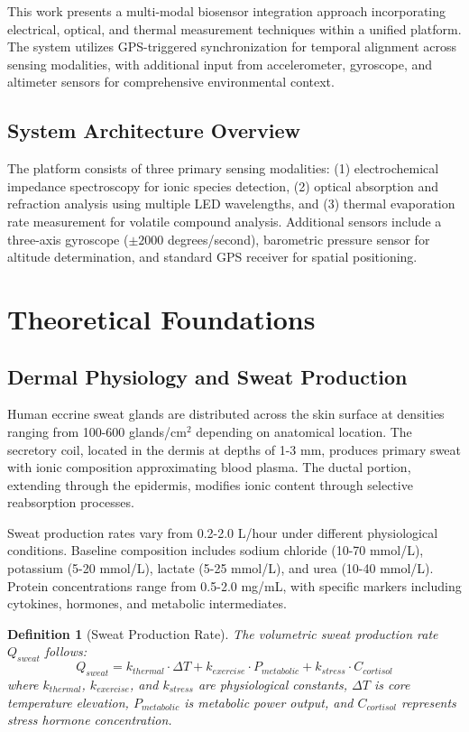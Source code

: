 \documentclass[12pt,a4paper]{article}
\newtheorem{definition}[theorem]{Definition}
\begin{document}
This work presents a multi-modal biosensor integration approach incorporating electrical, optical, and thermal measurement techniques within a unified platform. The system utilizes GPS-triggered synchronization for temporal alignment across sensing modalities, with additional input from accelerometer, gyroscope, and altimeter sensors for comprehensive environmental context.

\subsection{System Architecture Overview}

The platform consists of three primary sensing modalities: (1) electrochemical impedance spectroscopy for ionic species detection, (2) optical absorption and refraction analysis using multiple LED wavelengths, and (3) thermal evaporation rate measurement for volatile compound analysis. Additional sensors include a three-axis gyroscope (\(\pm 2000\) degrees/second), barometric pressure sensor for altitude determination, and standard GPS receiver for spatial positioning.

\section{Theoretical Foundations}

\subsection{Dermal Physiology and Sweat Production}

Human eccrine sweat glands are distributed across the skin surface at densities ranging from 100-600 glands/cm\(^2\) depending on anatomical location. The secretory coil, located in the dermis at depths of 1-3 mm, produces primary sweat with ionic composition approximating blood plasma. The ductal portion, extending through the epidermis, modifies ionic content through selective reabsorption processes.

Sweat production rates vary from 0.2-2.0 L/hour under different physiological conditions. Baseline composition includes sodium chloride (10-70 mmol/L), potassium (5-20 mmol/L), lactate (5-25 mmol/L), and urea (10-40 mmol/L). Protein concentrations range from 0.5-2.0 mg/mL, with specific markers including cytokines, hormones, and metabolic intermediates.

\begin{definition}[Sweat Production Rate]
The volumetric sweat production rate \(Q_{sweat}\) follows:
\begin{equation}
Q_{sweat} = k_{thermal} \cdot \Delta T + k_{exercise} \cdot P_{metabolic} + k_{stress} \cdot C_{cortisol}
\end{equation}
where \(k_{thermal}\), \(k_{exercise}\), and \(k_{stress}\) are physiological constants, \(\Delta T\) is core temperature elevation, \(P_{metabolic}\) is metabolic power output, and \(C_{cortisol}\) represents stress hormone concentration.
\end{definition}
\end{document}
